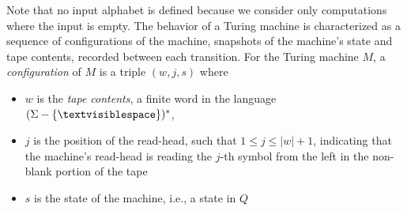 Note that no input alphabet is defined because we consider only
computations where the input is empty.
The behavior of a Turing machine
is characterized as a sequence of configurations of the machine,
snapshots of the machine's state and tape contents,
recorded between each transition.
For the Turing machine $M$,
a {\it configuration} of $M$ is a triple $(w, j, s)$ where
\begin{itemize}
    \item $w$ is the {\it tape contents}, a finite word in the language
    $(\Sigma-\{\blank\})^*$,
    \item $j$ is the position of the read-head,
    such that $1{\leq}j{\leq}|w|+1$,
    indicating that the machine's read-head is reading
    the $j$-th symbol from the left in the non-blank portion
    of the tape
    \item $s$ is the state of the machine, i.e., a state in $Q$
\end{itemize}


